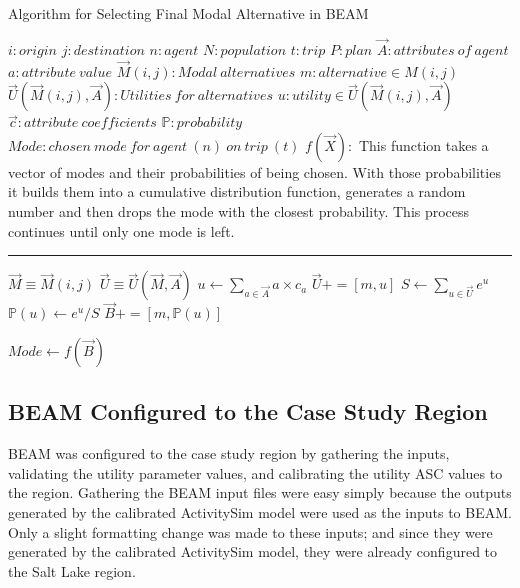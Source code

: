 \documentclass[fancy, masters]{byuthesis}
\begin{document}
\begin{algorithm}
\caption{Algorithm for Selecting Final Modal Alternative in BEAM}
\begin{algorithmic}[1]
\Require
\State $i : origin$
\State $j : destination$
\State $n: agent$
\State $N: population$
\State $t : trip $
\State $P : plan$
\State $\vec{A}: attributes\:of\:agent$
\State $a: attribute\:value$
\State $\vec{M}(i,j) : Modal\:alternatives$
\State $m : alternative \in M(i,j)$
\State $\vec{U}(\vec{M}(i,j),\vec{A}):Utilities\:for\:alternatives$
\State $u: utility \in \vec{U}(\vec{M}(i,j),\vec{A})$
\State $\vec{c}: attribute\:coefficients$
\State $\mathds{P}: probability$
\State $Mode: chosen\:mode\:for\:agent\:(n)\:on\:trip\:(t)$
\State $f(\vec{X}):$
This function takes a vector of modes and  their probabilities of being chosen. With those probabilities it builds them into a cumulative distribution function, generates a random number and then drops the mode with the closest probability. This process continues until only one mode is left.
\vspace{4pt}\hrule\vspace{5pt}

\State $\vec{M} \equiv \vec{M}(i,j)$
\State $\vec{U} \equiv \vec{U}(\vec{M},\vec{A})$
  \State $u \gets \sum_{a\in \vec{A}} a \times c_a$
  \State $\vec{U} += [m,u]$
\EndFor
\State $S \gets \sum_{u\in \vec{U}}e^u$
    \State $\mathds{P}(u)\gets e^u / S$
    \State $\vec{B} +=[m, \mathds{P}(u)]$
\EndFor 

\State $Mode \gets f(\vec{B})$

\EndProcedure

\EndFor
\EndFor
\Statex
\end{algorithmic}
\end{algorithm}

\hypertarget{beam-configured-to-the-case-study-region}{%
\subsection{BEAM Configured to the Case Study Region}\label{beam-configured-to-the-case-study-region}}

BEAM was configured to the case study region by gathering the inputs, validating the utility parameter values, and calibrating the utility ASC values to the region. Gathering the BEAM input files were easy simply because the outputs generated by the calibrated ActivitySim model were used as the inputs to BEAM. Only a slight formatting change was made to these inputs; and since they were generated by the calibrated ActivitySim model, they were already configured to the Salt Lake region.
\end{document}
